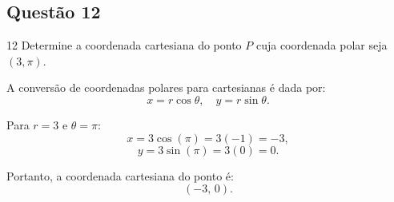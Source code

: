 \subsection*{Questão 12}

\begin{questionbox}{12}
  Determine a coordenada cartesiana do ponto $P$ cuja coordenada polar seja $(3,\pi)$.
\end{questionbox}

\begin{solutionbox}
  A conversão de coordenadas polares para cartesianas é dada por:
  \[
  x = r\cos\theta, \quad y = r\sin\theta.
  \]

  Para $r = 3$ e $\theta = \pi$:
  \[
  x = 3\cos(\pi) = 3(-1) = -3,
  \]
  \[
  y = 3\sin(\pi) = 3(0) = 0.
  \]
  \end{solutionbox}

  \begin{solutionbox}
  Portanto, a coordenada cartesiana do ponto é:
  \[
  \boxed{(-3,\,0)}.
  \]
\end{solutionbox}